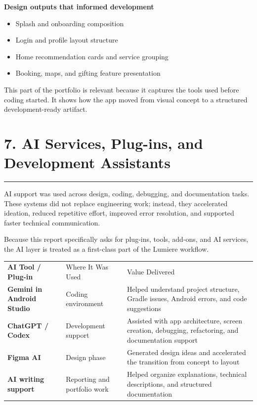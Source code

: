 \documentclass[11pt,a4paper]{article}
\newcommand{\PageTitle}[1]{\section*{#1}\vspace{2pt}\textcolor{LumiereGold}{\rule{\textwidth}{1.1pt}}\vspace{6pt}}
\newcommand{\SmallSpace}{\vspace{4pt}}
\begin{document}
\SmallSpace
\begin{tcolorbox}[colback=LumiereCream,colframe=LumiereLine,boxrule=0.6pt,arc=2mm]
\textbf{\textcolor{LumiereDark}{Design outputs that informed development}}
\begin{itemize}
\item Splash and onboarding composition
\item Login and profile layout structure
\item Home recommendation cards and service grouping
\item Booking, maps, and gifting feature presentation
\end{itemize}
\end{tcolorbox}

This part of the portfolio is relevant because it captures the tools used before coding started. It shows how the app moved from visual concept to a structured development-ready artifact.

\newpage
\PageTitle{7. AI Services, Plug-ins, and Development Assistants}

AI support was used across design, coding, debugging, and documentation tasks. These systems did not replace engineering work; instead, they accelerated ideation, reduced repetitive effort, improved error resolution, and supported faster technical communication.

Because this report specifically asks for plug-ins, tools, add-ons, and AI services, the AI layer is treated as a first-class part of the Lumiere workflow.

\begin{tabularx}{\textwidth}{>{\bfseries}p{3.2cm} p{3.0cm} Y}
\color{white}AI Tool / Plug-in & \color{white}Where It Was Used & \color{white}Value Delivered \\
Gemini in Android Studio & Coding environment & Helped understand project structure, Gradle issues, Android errors, and code suggestions \\
ChatGPT / Codex & Development support & Assisted with app architecture, screen creation, debugging, refactoring, and documentation support \\
Figma AI & Design phase & Generated design ideas and accelerated the transition from concept to layout \\
AI writing support & Reporting and portfolio work & Helped organize explanations, technical descriptions, and structured documentation \\
\end{tabularx}
\end{document}
